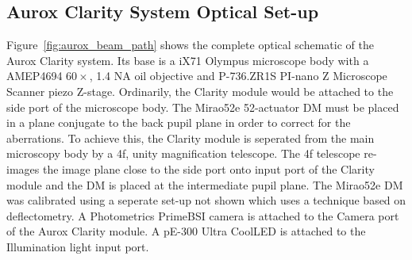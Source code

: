 \subsection{Aurox Clarity System Optical Set-up}
\label{subsec:aurox_optics}

Figure~\ref{fig:aurox_beam_path} shows the complete optical schematic of the Aurox Clarity system. Its base is a iX71 Olympus microscope body with a AMEP4694 $60\times$, 1.4 NA oil objective and P-736.ZR1S PI-nano Z Microscope Scanner piezo Z-stage. Ordinarily, the Clarity module would be attached to the side port of the microscope body. The Mirao52e 52-actuator DM must be placed in a plane conjugate to the back pupil plane in order to correct for the aberrations. To achieve this, the Clarity module is seperated from the main microscopy body by a 4f, unity magnification telescope. The 4f telescope re-images the image plane close to the side port onto input port of the Clarity module and the DM is placed at the intermediate pupil plane. The Mirao52e DM was calibrated using a seperate set-up not shown which uses a technique based on deflectometry.\cite{trumper2016instantaneous,huang2017close} A Photometrics PrimeBSI camera is attached to the Camera port of the Aurox Clarity module. A pE-300 Ultra CoolLED is attached to the Illumination light input port.

